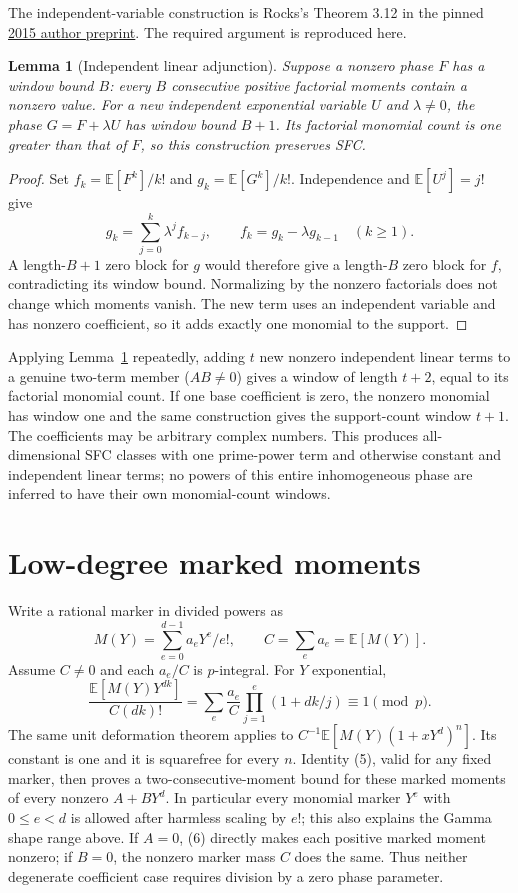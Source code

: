 \documentclass[11pt]{article}
\newtheorem{lemma}[theorem]{Lemma}
\begin{document}
The independent-variable construction is Rocks's Theorem 3.12 in the
pinned \href{sources/rocks-2015-author-preprint.pdf}{2015 author preprint}.
The required argument is reproduced here.

\begin{lemma}[Independent linear adjunction]\label{lem:adjunction}
Suppose a nonzero phase $F$ has a window bound $B$: every $B$ consecutive
positive factorial moments contain a nonzero value. For a new independent
exponential variable $U$ and $\lambda\ne0$, the phase
$G=F+\lambda U$ has window bound $B+1$. Its factorial monomial count is
one greater than that of $F$, so this construction preserves SFC.
\end{lemma}
\begin{proof}
Set $f_k=\mathbb E[F^k]/k!$ and $g_k=\mathbb E[G^k]/k!$.
Independence and $\mathbb E[U^j]=j!$ give
\[
 g_k=\sum_{j=0}^k\lambda^j f_{k-j},\qquad
 f_k=g_k-\lambda g_{k-1}\quad(k\ge1).
\]
A length-$B+1$ zero block for $g$ would therefore give a length-$B$
zero block for $f$, contradicting its window bound. Normalizing by the
nonzero factorials does not change which moments vanish. The new term
uses an independent variable and has nonzero coefficient, so it adds
exactly one monomial to the support.
\end{proof}

Applying Lemma~\ref{lem:adjunction} repeatedly, adding $t$ new nonzero
independent linear terms to a genuine two-term member ($AB\ne0$) gives
a window of length $t+2$, equal to its factorial monomial count. If one
base coefficient is zero, the nonzero monomial has window one and the
same construction gives the support-count window $t+1$.
The coefficients may be arbitrary complex numbers. This produces
all-dimensional SFC classes with one prime-power term and otherwise
constant and independent linear terms; no powers of this entire
inhomogeneous phase are inferred to have their own monomial-count windows.

\section{Low-degree marked moments}
Write a rational marker in divided powers as
\[
 M(Y)=\sum_{e=0}^{d-1}a_eY^e/e!,\qquad C=\sum_e a_e=\mathbb E[M(Y)].
\]
Assume $C\ne0$ and each $a_e/C$ is $p$-integral. For $Y$ exponential,
\[
 \frac{\mathbb E[M(Y)Y^{dk}]}{C(dk)!}
 =\sum_e\frac{a_e}{C}\prod_{j=1}^{e}(1+dk/j)
 \equiv1\pmod p.                                  \tag{6}
\]
The same unit deformation theorem applies to
$C^{-1}\mathbb E[M(Y)(1+xY^d)^n]$. Its constant is one and it is
squarefree for every $n$. Identity (5), valid for any fixed marker,
then proves a two-consecutive-moment bound for these marked moments
of every nonzero $A+BY^d$. In particular every monomial marker $Y^e$
with $0\le e<d$ is allowed after harmless scaling by $e!$; this also
explains the Gamma shape range above.
If $A=0$, (6) directly makes each positive marked moment nonzero; if
$B=0$, the nonzero marker mass $C$ does the same. Thus neither degenerate
coefficient case requires division by a zero phase parameter.
\end{document}
